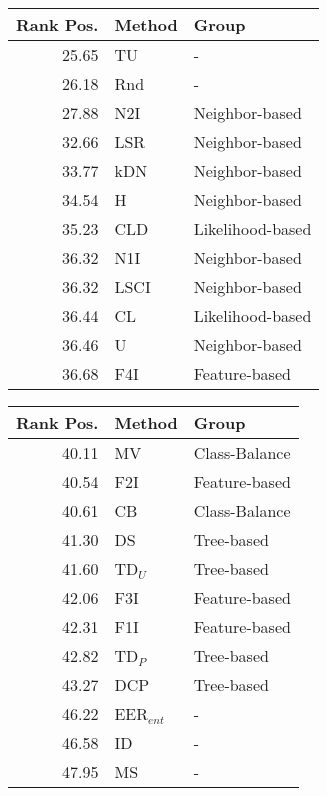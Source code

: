 \begin{tabular}{rll}
\toprule
Rank Pos. & Method & Group \\
\midrule
25.65 & TU & - \\
26.18 & Rnd & - \\
27.88 & N2I & Neighbor-based \\
32.66 & LSR & Neighbor-based \\
33.77 & kDN & Neighbor-based \\
34.54 & H & Neighbor-based \\
35.23 & CLD & Likelihood-based \\
36.32 & N1I & Neighbor-based \\
36.32 & LSCI & Neighbor-based \\
36.44 & CL & Likelihood-based \\
36.46 & U & Neighbor-based \\
36.68 & F4I & Feature-based \\
\bottomrule
\end{tabular}
\begin{tabular}{rll}
\toprule
Rank Pos. & Method & Group \\
\midrule
40.11 & MV & Class-Balance \\
40.54 & F2I & Feature-based \\
40.61 & CB & Class-Balance \\
41.30 & DS & Tree-based \\
41.60 & TD$_U$ & Tree-based \\
42.06 & F3I & Feature-based \\
42.31 & F1I & Feature-based \\
42.82 & TD$_P$ & Tree-based \\
43.27 & DCP & Tree-based \\
46.22 & EER$_{ent}$ & - \\
46.58 & ID & - \\
47.95 & MS & - \\
\bottomrule
\end{tabular}
